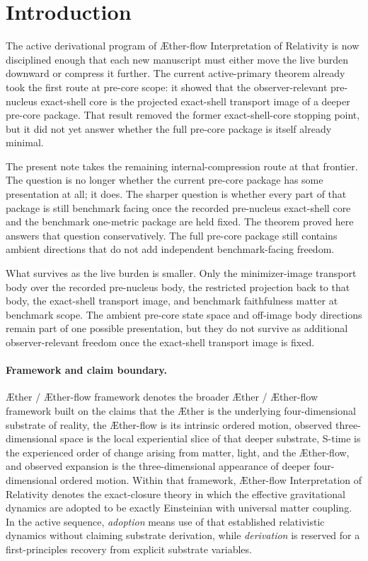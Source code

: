 \documentclass[11pt]{article}
\newcommand{\Aether}{\AE{}ther}
\newcommand{\Aflow}{\AE{}ther-flow}
\newcommand{\TheoryName}{\Aflow{} Interpretation of Relativity}
\newcommand{\TheoryProgram}{\Aether{} / \Aflow{} framework}
\begin{document}
\section{Introduction}

The active derivational program of \TheoryName{} is now disciplined enough that each new manuscript must either move the live burden downward or compress it further. The current active-primary theorem already took the first route at pre-core scope: it showed that the observer-relevant pre-nucleus exact-shell core is the projected exact-shell transport image of a deeper pre-core package. That result removed the former exact-shell-core stopping point, but it did not yet answer whether the full pre-core package is itself already minimal.

The present note takes the remaining internal-compression route at that frontier. The question is no longer whether the current pre-core package has some presentation at all; it does. The sharper question is whether every part of that package is still benchmark facing once the recorded pre-nucleus exact-shell core and the benchmark one-metric package are held fixed. The theorem proved here answers that question conservatively. The full pre-core package still contains ambient directions that do not add independent benchmark-facing freedom.

What survives as the live burden is smaller. Only the minimizer-image transport body over the recorded pre-nucleus body, the restricted projection back to that body, the exact-shell transport image, and benchmark faithfulness matter at benchmark scope. The ambient pre-core state space and off-image body directions remain part of one possible presentation, but they do not survive as additional observer-relevant freedom once the exact-shell transport image is fixed.

\paragraph{Framework and claim boundary.}
\TheoryProgram{} denotes the broader \Aether{} / \Aflow{} framework built on the claims that the \Aether{} is the underlying four-dimensional substrate of reality, the \Aflow{} is its intrinsic ordered motion, observed three-dimensional space is the local experiential slice of that deeper substrate, S-time is the experienced order of change arising from matter, light, and the \Aflow{}, and observed expansion is the three-dimensional appearance of deeper four-dimensional ordered motion. Within that framework, \TheoryName{} denotes the exact-closure theory in which the effective gravitational dynamics are adopted to be exactly Einsteinian with universal matter coupling. In the active sequence, \emph{adoption} means use of that established relativistic dynamics without claiming substrate derivation, while \emph{derivation} is reserved for a first-principles recovery from explicit substrate variables.
\end{document}
